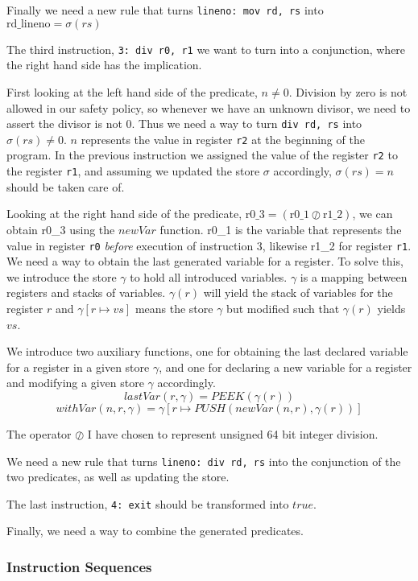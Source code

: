 Finally we need a new rule that turns \texttt{lineno: mov rd, rs} into $\text{rd\_lineno} = \sigma(rs)$


The third instruction,  \texttt{3: div r0, r1} we want to turn into a conjunction, where the right hand side has the implication.


First looking at the left hand side of the predicate, $n \neq 0$.
Division by zero is not allowed in our safety policy, so whenever we have an unknown divisor, we need to assert the divisor is not 0. Thus we need a way to turn \texttt{div rd, rs} into $\sigma(rs) \neq 0$.
$n$ represents the value in register \texttt{r2} at the beginning of the program. In the previous instruction we assigned the value of the register \texttt{r2} to the register \texttt{r1}, and assuming we updated the store $\sigma$ accordingly, $\sigma(rs) = n$ should be taken care of. 


Looking at the right hand side of the predicate, $\text{r0\_3} = (\text{r0\_1} \oslash \text{r1\_2})$, we can obtain r0\_3 using the $newVar$ function. r0\_1 is the variable that represents the value in register \texttt{r0} \textit{before} execution of instruction 3, likewise r1\_2 for register \texttt{r1}. We need a way to obtain the last generated variable for a register.
To solve this, we introduce the store $\gamma$ to hold all introduced variables. $\gamma$ is a mapping between registers and stacks of variables.
$\gamma(r)$ will yield the stack of variables for the register $r$ and $\gamma[r \mapsto vs]$ means the store $\gamma$ but modified such that $\gamma(r)$ yields $vs$.

We introduce two auxiliary functions, one for obtaining the last declared variable for a register in a given store $\gamma$, and one for declaring a new variable for a register and modifying a given store $\gamma$ accordingly.
\[
  lastVar(r, \gamma) = PEEK (\gamma(r))
\]
\[
  withVar(n, r, \gamma) = \gamma[r \mapsto PUSH(newVar(n, r), \gamma(r))]
\]


The operator $\oslash$ I have chosen to represent unsigned 64 bit integer division.

We need a new rule that turns \texttt{lineno: div rd, rs} into the conjunction of the two predicates, as well as updating the store.

The last instruction, \texttt{4: exit} should be transformed into $true$. 


Finally, we need a way to combine the generated predicates. 


\subsubsection{Instruction Sequences}

